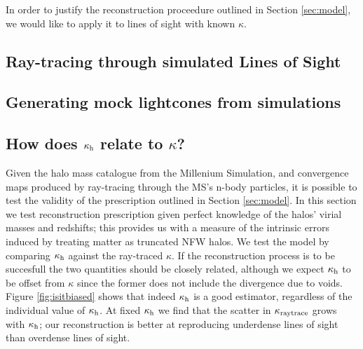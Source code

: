 \documentclass[useAMS,usenatbib]{mn2e}
\begin{document}
In order to justify the reconstruction proceedure outlined in Section \ref{sec:model}, we would like to apply it to lines of sight with known $\kappa$. 


\subsection{Ray-tracing through simulated Lines of Sight}
\label{subsec:raytracing}

\subsection{Generating mock lightcones from simulations}

\subsection{How does $\kappa_{\rm h}$ relate to $\kappa$?}

Given the halo mass catalogue from the Millenium Simulation, 
and convergence maps produced by ray-tracing through the MS's n-body particles, 
it is possible to test the validity of the prescription outlined
in Section \ref{sec:model}. In this section we test reconstruction prescription given perfect
knowledge of the halos' virial masses and redshifts; this provides us with a measure of the intrinsic
errors induced by treating matter as truncated NFW halos. 
We test the model by comparing $\kappa_{\rm h}$ against
the ray-traced $\kappa$. If the reconstruction process is to be
succesfull the two quantities should be closely related, although
we expect $\kappa_{\rm h}$ to be offset from $\kappa$ since the former 
does not include the divergence due to voids. Figure \ref{fig:isitbiased} shows that indeed $\kappa_{\rm h}$ is a good estimator, regardless of the individual value of $\kappa_{\rm h}$. At fixed $\kappa_{\rm h}$ we find that the scatter in $\kappa_{\rm raytrace}$ grows with $\kappa_{\rm h}$; our reconstruction is better at reproducing underdense lines of sight than overdense lines of sight.
\end{document}
